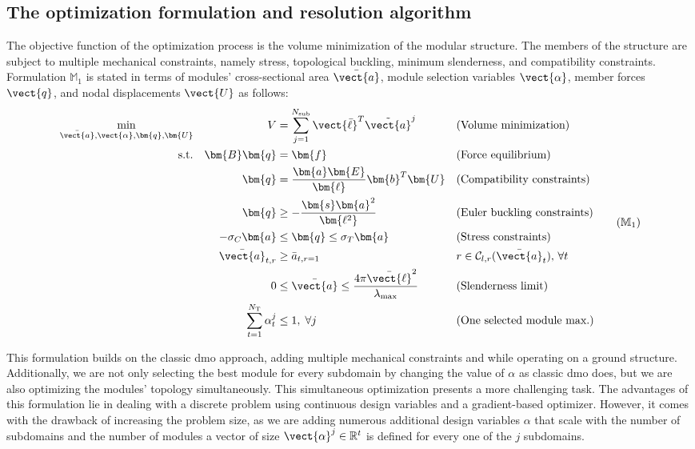 \subsection{The optimization formulation and resolution algorithm}
The objective function of the optimization process is the volume minimization of the modular structure. The members of the structure are subject to multiple mechanical constraints, namely stress, topological buckling, minimum slenderness, and compatibility constraints. Formulation $\mathbb{M}_1$ is stated in terms of modules' cross-sectional area $\bar{\vect{a}}$, module selection variables $\vect{\alpha}$, member forces $\vect{q}$, and nodal displacements $\vect{U}$ as follows:
\begin{equation}
    \begin{aligned}
    \min_{\bar{\vect{a}}, \vect{\alpha}, \bm{q}, \bm{U}}   && V &= \sum_{j=1}^{N_{\text{sub}}}\vect{\bar{\ell}}^T\tilde{\vect{a}}^j && \textrm{(Volume minimization)}\\
    \textrm{s.t.}   && \bm{B}\bm{q} &= \bm{f} && \textrm{(Force equilibrium)}\\
                    && \bm{q} &= \frac{\bm{a}\bm{E}}{\bm{\ell}}\bm{b}^T\bm{U} && \textrm{(Compatibility constraints)} \\
                    && \bm{q} &\geq -\frac{\bm{s}\bm{a}^2}{\bm{\ell^2}} && \textrm{(Euler buckling constraints)} \\
                    && -\sigma_C\bm{a} &\leq \bm{q} \leq \sigma_T\bm{a} && \textrm{(Stress constraints)} \\
                    && \bar{\vect{a}}_{t,r}&\geq \bar{a}_{t,r=1} && r \in \mathcal{C}_{l,r}(\bar{\vect{a}}_t),\, \forall t \\
                    && 0 &\leq \bar{\vect{a}} \leq \frac{4 \pi \bar{\vect{\ell}}^2}{\lambda_{\text{max}}} && \textrm{(Slenderness limit)} \\
                    && \sum_{t=1}^{N_\text{T}} \alpha_t^j &\leq 1, \; \forall j && \textrm{(One selected module max.)} \\
    \end{aligned}
    \tag{$\mathbb{M}_1$}
    \label{eq:06_optim_complete}
\end{equation}

This formulation builds on the classic \gls{dmo} approach, adding multiple mechanical constraints and while operating on a ground structure. Additionally, we are not only selecting the best module for every subdomain by changing the value of $\alpha$ as classic \gls{dmo} does, but we are also optimizing the modules' topology simultaneously. This simultaneous optimization presents a more challenging task. The advantages of this formulation lie in dealing with a discrete problem using continuous design variables and a gradient-based optimizer. However, it comes with the drawback of increasing the problem size, as we are adding numerous additional design variables $\alpha$ that scale with the number of subdomains and the number of modules \ie a vector of size $\vect{\alpha}^j \in \mathbb{R}^t$ is defined for every one of the $j$ subdomains.


